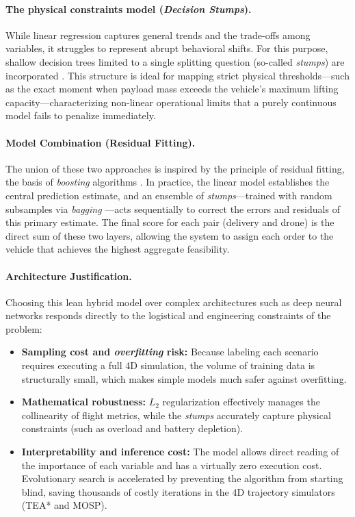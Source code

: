 \paragraph{The physical constraints model (\textit{Decision Stumps}).} 
While linear regression captures general trends and the trade-offs among variables, it struggles to represent abrupt behavioral shifts. For this purpose, shallow decision trees limited to a single splitting question (so-called \textit{stumps}) are incorporated \cite{iba1992}. This structure is ideal for mapping strict physical thresholds—such as the exact moment when payload mass exceeds the vehicle's maximum lifting capacity—characterizing non-linear operational limits that a purely continuous model fails to penalize immediately.

\paragraph{Model Combination (Residual Fitting).} 
The union of these two approaches is inspired by the principle of residual fitting, the basis of \textit{boosting} algorithms \cite{friedman2001}. In practice, the linear model establishes the central prediction estimate, and an ensemble of \textit{stumps}—trained with random subsamples via \textit{bagging} \cite{breiman1996}—acts sequentially to correct the errors and residuals of this primary estimate. The final score for each pair (delivery and drone) is the direct sum of these two layers, allowing the system to assign each order to the vehicle that achieves the highest aggregate feasibility.

\paragraph{Architecture Justification.} 
Choosing this lean hybrid model over complex architectures such as deep neural networks responds directly to the logistical and engineering constraints of the problem:
\begin{itemize}
    \item \textbf{Sampling cost and \textit{overfitting} risk:} Because labeling each scenario requires executing a full 4D simulation, the volume of training data is structurally small, which makes simple models much safer against overfitting.
    \item \textbf{Mathematical robustness:} $L_2$ regularization effectively manages the collinearity of flight metrics, while the \textit{stumps} accurately capture physical constraints (such as overload and battery depletion).
    \item \textbf{Interpretability and inference cost:} The model allows direct reading of the importance of each variable and has a virtually zero execution cost. Evolutionary search is accelerated by preventing the algorithm from starting blind, saving thousands of costly iterations in the 4D trajectory simulators (TEA* and MOSP).
\end{itemize}

